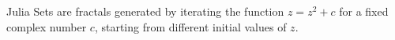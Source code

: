 \documentclass[preview]{standalone}
\begin{document}
\begin{center}
Julia Sets are fractals generated by iterating the function
$z = z^2 + c$ for a fixed complex number $c$, starting from
different initial values of $z$.
\end{center}
\end{document}

